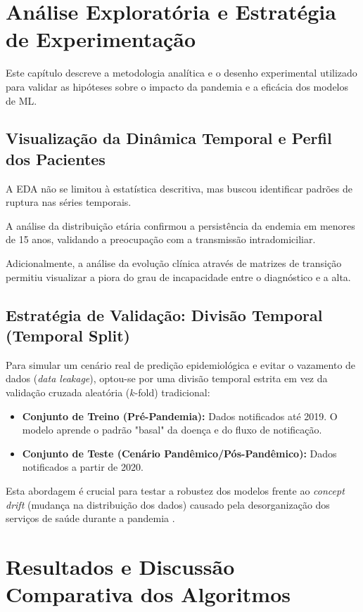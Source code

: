 \documentclass[12pt, a4paper]{report}
\begin{document}
\chapter{Análise Exploratória e Estratégia de Experimentação}

Este capítulo descreve a metodologia analítica e o desenho experimental utilizado para validar as hipóteses sobre o impacto da pandemia e a eficácia dos modelos de ML.

\section{Visualização da Dinâmica Temporal e Perfil dos Pacientes}
A EDA não se limitou à estatística descritiva, mas buscou identificar padrões de ruptura nas séries temporais.

\textbf{}

A análise da distribuição etária confirmou a persistência da endemia em menores de 15 anos, validando a preocupação com a transmissão intradomiciliar.

\textbf{}

Adicionalmente, a análise da evolução clínica através de matrizes de transição permitiu visualizar a piora do grau de incapacidade entre o diagnóstico e a alta.

\textbf{}

\section{Estratégia de Validação: Divisão Temporal (Temporal Split)}
Para simular um cenário real de predição epidemiológica e evitar o vazamento de dados (\textit{data leakage}), optou-se por uma divisão temporal estrita em vez da validação cruzada aleatória ($k$-fold) tradicional:
\begin{itemize}
    \item \textbf{Conjunto de Treino (Pré-Pandemia):} Dados notificados até 2019. O modelo aprende o padrão "basal" da doença e do fluxo de notificação.
    \item \textbf{Conjunto de Teste (Cenário Pandêmico/Pós-Pandêmico):} Dados notificados a partir de 2020.
\end{itemize}
Esta abordagem é crucial para testar a robustez dos modelos frente ao \textit{concept drift} (mudança na distribuição dos dados) causado pela desorganização dos serviços de saúde durante a pandemia \citep{sousa2025interrupted, oliveira2024human}.

\chapter{Resultados e Discussão Comparativa dos Algoritmos}
\end{document}
